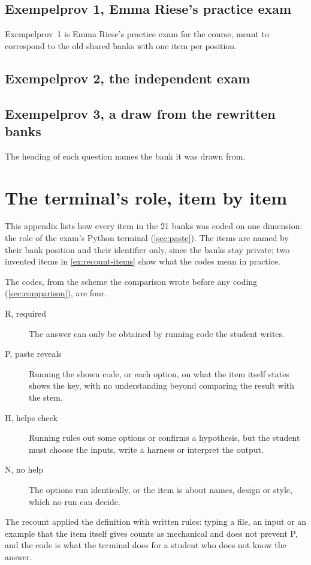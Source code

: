\section{Exempelprov 1, Emma Riese's practice exam}
\label{sec:ep1}

Exempelprov~1 is Emma Riese's practice exam for the course, meant to
correspond to the old shared banks with one item per position.

{\raggedright

\par}

\section{Exempelprov 2, the independent exam}
\label{sec:ep2}

{\raggedright

\par}

\section{Exempelprov 3, a draw from the rewritten banks}
\label{sec:ep3}

The heading of each question names the bank it was drawn from.

{\raggedright

\par}


\chapter{The terminal's role, item by item}
\label{app:codes}

This appendix lists how every item in the 21 banks was coded on one
dimension: the role of the exam's Python terminal (\cref{sec:paste}).
The items are named by their bank position and their identifier only,
since the banks stay private; two invented items in
\cref{ex:recount-items} show what the codes mean in practice.

The codes, from the scheme the comparison wrote before any coding
(\cref{sec:comparison}), are four.
\begin{description}
  \item[R, required] The answer can only be obtained by running code the
    student writes.
  \item[P, paste reveals] Running the shown code, or each option, on what
    the item itself states shows the key, with no understanding beyond
    comparing the result with the stem.
  \item[H, helps check] Running rules out some options or confirms a
    hypothesis, but the student must choose the inputs, write a harness
    or interpret the output.
  \item[N, no help] The options run identically, or the item is about
    names, design or style, which no run can decide.
\end{description}
The recount applied the definition with written rules: typing a file,
an input or an example that the item itself gives counts as mechanical
and does not prevent P, and the code is what the terminal does for a
student who does not know the answer.

